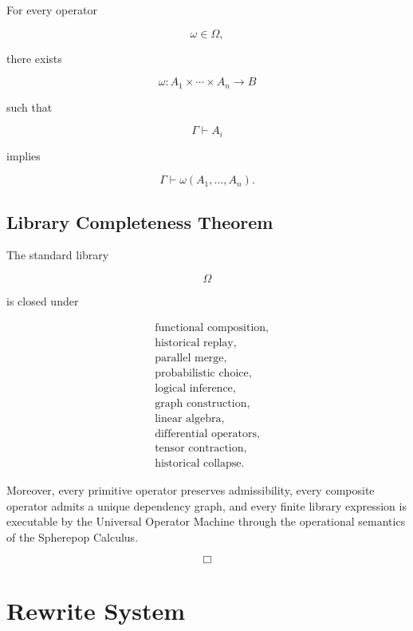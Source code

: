 \documentclass[12pt,oneside]{article}
\theoremstyle{definition}
\theoremstyle{remark}
\begin{document}
For every operator

\[
\omega
\in
\Omega,
\]

there exists

\[
\omega
:
A_1
\times
\cdots
\times
A_n
\rightarrow
B
\]

such that

\[
\Gamma
\vdash
A_i
\]

implies

\[
\Gamma
\vdash
\omega
(A_1,\ldots,A_n).
\]

\subsection*{Library Completeness Theorem}

The standard library

\[
\boxed{\Omega}
\]

is closed under

\[
\begin{aligned}
&
\text{functional composition},\\
&
\text{historical replay},\\
&
\text{parallel merge},\\
&
\text{probabilistic choice},\\
&
\text{logical inference},\\
&
\text{graph construction},\\
&
\text{linear algebra},\\
&
\text{differential operators},\\
&
\text{tensor contraction},\\
&
\text{historical collapse}.
\end{aligned}
\]

Moreover, every primitive operator preserves admissibility, every composite
operator admits a unique dependency graph, and every finite library expression
is executable by the Universal Operator Machine through the operational
semantics of the Spherepop Calculus.

\[
\Box
\]

\section{Rewrite System}
\end{document}
